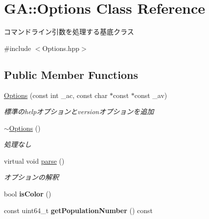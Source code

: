 \hypertarget{class_g_a_1_1_options}{}\section{GA\+::Options Class Reference}
\label{class_g_a_1_1_options}


コマンドライン引数を処理する基底クラス  




{\ttfamily \#include $<$Options.\+hpp$>$}

\subsection*{Public Member Functions}
\begin{DoxyCompactItemize}
\item 
\mbox{\label{class_g_a_1_1_options_a12ed88bc6f90c447b4742d1bd643a530}} 
\mbox{\hyperlink{class_g_a_1_1_options_a12ed88bc6f90c447b4742d1bd643a530}{Options}} (const int \+\_\+ac, const char $\ast$const $\ast$const \+\_\+av)
\begin{DoxyCompactList}\small\item\em 標準のhelpオプションとversionオプションを追加 \end{DoxyCompactList}\item 
\mbox{\label{class_g_a_1_1_options_a8d0d013e8198245d530e362be30dd802}} 
\mbox{\hyperlink{class_g_a_1_1_options_a8d0d013e8198245d530e362be30dd802}{$\sim$\+Options}} ()
\begin{DoxyCompactList}\small\item\em 処理なし \end{DoxyCompactList}\item 
virtual void \mbox{\hyperlink{class_g_a_1_1_options_a8d16d8303f4988f0a5c3cf5b15492c24}{parse}} ()
\begin{DoxyCompactList}\small\item\em オプションの解釈 \end{DoxyCompactList}\item 
\mbox{\label{class_g_a_1_1_options_a84742afdf96565a5c76a820350cf3f6a}} 
bool {\bfseries is\+Color} ()
\item 
\mbox{\label{class_g_a_1_1_options_a2b64c48a38e4ddb21907ff0c20ca16a6}} 
const uint64\+\_\+t {\bfseries get\+Population\+Number} () const

\end{DoxyCompactItemize}
